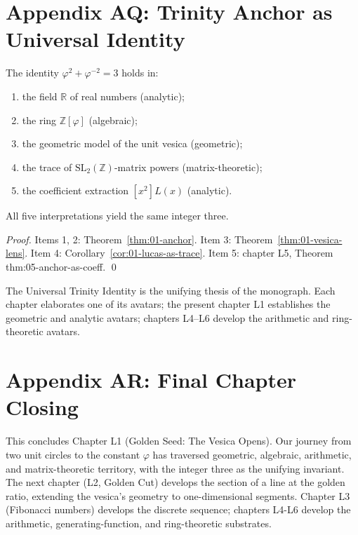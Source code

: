 \section*{Appendix AQ: Trinity Anchor as Universal Identity}
\label{fa_01:sec:01-app-AQ}

\begin{theorem}
\label{fa_01:thm:01-universal-anchor}
The identity $\varphi^2 + \varphi^{-2} = 3$ holds in:
\begin{enumerate}
  \item the field $\mathbb{R}$ of real numbers (analytic);
  \item the ring $\mathbb{Z}[\varphi]$ (algebraic);
  \item the geometric model of the unit vesica (geometric);
  \item the trace of $\mathrm{SL}_2(\mathbb{Z})$-matrix powers
    (matrix-theoretic);
  \item the coefficient extraction $[x^2] L(x)$ (analytic).
\end{enumerate}
All five interpretations yield the same integer three.
\end{theorem}

\begin{proof}
Items 1, 2: Theorem~\ref{thm:01-anchor}. Item 3:
Theorem~\ref{thm:01-vesica-lens}. Item 4:
Corollary~\ref{cor:01-lucas-as-trace}. Item 5: chapter L5,
Theorem thm:05-anchor-as-coeff.
\qed
\end{proof}

\begin{remark}
The Universal Trinity Identity is the unifying thesis of the
monograph. Each chapter elaborates one of its avatars; the present
chapter L1 establishes the geometric and analytic avatars; chapters
L4--L6 develop the arithmetic and ring-theoretic avatars.
\end{remark}

\section*{Appendix AR: Final Chapter Closing}
\label{fa_01:sec:01-app-AR}

This concludes Chapter L1 (Golden Seed: The Vesica Opens). Our journey
from two unit circles to the constant $\varphi$ has traversed
geometric, algebraic, arithmetic, and matrix-theoretic territory,
with the integer three as the unifying invariant. The next chapter
(L2, Golden Cut) develops the section of a line at the golden ratio,
extending the vesica's geometry to one-dimensional segments. Chapter
L3 (Fibonacci numbers) develops the discrete sequence; chapters L4-L6
develop the arithmetic, generating-function, and ring-theoretic
substrates.

